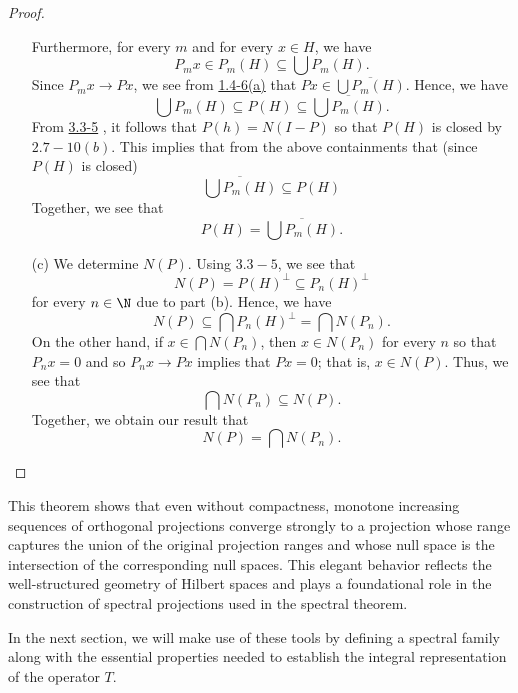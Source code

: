 \begin{proof}
\begin{enumerate}
            Furthermore, for every \( m  \) and for every \( x \in H  \), we have 
            \[  {P}_{m}x \in {P}_{m}(H) \subseteq \bigcup {P}_{m}(H). \]
            Since \( {P}_{m}x \to Px  \), we see from {\hyperref[1.4-6]{1.4-6(a)}} that \( Px \in \overline{\bigcup {P}_{m}(H) } \). Hence, we have 
            \[  \bigcup {P}_{m}(H) \subseteq P(H) \subseteq \overline{ \bigcup {P}_{m}(H) }. \]
            From {\hyperref[3.3-5]{3.3-5}} , it follows that \( P(h) = N(I - P) \) so that \( P(H) \) is closed by \( {\hyperref[2.7-10]{2.7-10(b)}}  \). This implies that from the above containments that (since \( P(H) \) is closed)
            \[ \overline{\bigcup {P}_{m}(H) } \subseteq P(H)  \]
            Together, we see that 
            \[ P(H) = \overline{\bigcup {P}_{m}(H) }.\]
        \item[(c)] We determine \( N(P)  \). Using \( {\hyperref[3.3-5]{3.3-5}}  \), we see that 
            \[  N(P) = P(H)^{\perp} \subseteq {P}_{n}(H)^{\perp} \] for every \( n \in \N \) due to part (b). Hence, we have 
            \[  N(P) \subseteq \bigcap {P}_{n}(H)^{\perp} = \bigcap N({P}_{n}).  \]
            On the other hand, if \( x \in \bigcap N({P}_{n}) \), then \( x \in N({P}_{n}) \) for every \( n  \) so that \( {P}_{n}x = 0  \) and so \( {P}_{n}x \to Px  \) implies that \( Px = 0  \); that is, \( x \in   N(P) \). Thus, we see that 
            \[ \bigcap N({P}_{n}) \subseteq N(P). \]
            Together, we obtain our result that 
            \[ N(P) = \bigcap N({P}_{n}). \]
            \end{enumerate}
    \end{proof}

This theorem shows that even without compactness, monotone increasing sequences of orthogonal projections converge strongly to a projection whose range captures the union of the original projection ranges and whose null space is the intersection of the corresponding null spaces. This elegant behavior reflects the well-structured geometry of Hilbert spaces and plays a foundational role in the construction of spectral projections used in the spectral theorem.

In the next section, we will make use of these tools by defining a spectral family along with the essential properties needed to establish the integral representation of the operator \( T \).


